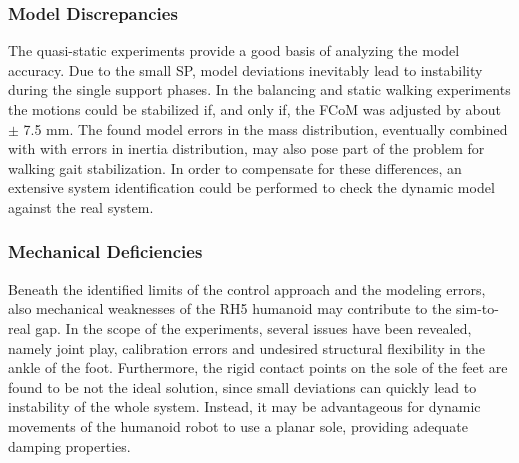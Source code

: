 \subsubsection{Model Discrepancies}
The quasi-static experiments provide a good basis of analyzing the model accuracy. Due to the small \gls{SP}, model deviations inevitably lead to instability during the single support phases. In the balancing and static walking experiments the motions could be stabilized if, and only if, the \gls{FCoM} was adjusted by about $\pm$ 7.5 mm. The found model errors in the mass distribution, eventually combined with with errors in inertia distribution, may also pose part of the problem for walking gait stabilization. In order to compensate for these differences, an extensive system identification could be performed to check the dynamic model against the real system.
\subsubsection{Mechanical Deficiencies}
Beneath the identified limits of the control approach and the modeling errors, also mechanical weaknesses of the RH5 humanoid may contribute to the sim-to-real gap. In the scope of the experiments, several issues have been revealed, namely joint play, calibration errors and undesired structural flexibility in the ankle of the foot. Furthermore, the rigid contact points on the sole of the feet are found to be not the ideal solution, since small deviations can quickly lead to instability of the whole system. Instead, it may be advantageous for dynamic movements of the humanoid robot to use a planar sole, providing adequate damping properties. 


























